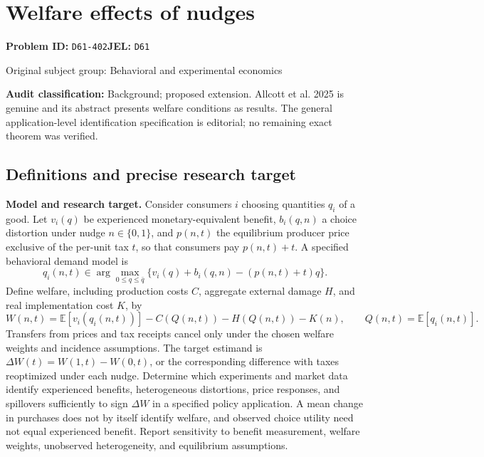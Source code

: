 \documentclass[11pt,a4paper]{article}
\begin{document}
\section*{Welfare effects of nudges}
\textbf{Problem ID:} \texttt{D61-402}\quad \textbf{JEL:} \texttt{D61}\par
\label{problem:OP-0309}
{\sffamily\small\color{muted}Original subject group: Behavioral and experimental economics\par}
\label{definitions:problem:30007591}
\textbf{Audit classification:} Background; proposed extension. Allcott et al. 2025 is genuine and its abstract presents welfare conditions as results. The general application-level identification specification is editorial; no remaining exact theorem was verified.
\subsection*{Definitions and precise research target}
\textbf{Model and research target.} Consider consumers \(i\) choosing quantities \(q_i\) of a good. Let \(v_i(q)\) be experienced monetary-equivalent benefit, \(b_i(q,n)\) a choice distortion under nudge \(n\in\{0,1\}\), and \(p(n,t)\) the equilibrium producer price exclusive of the per-unit tax \(t\), so that consumers pay \(p(n,t)+t\). A specified behavioral demand model is
\[q_i(n,t)\in\arg\max_{0\leq q\leq\bar q}\{v_i(q)+b_i(q,n)-(p(n,t)+t)q\}.\]
Define welfare, including production costs \(C\), aggregate external damage \(H\), and real implementation cost \(K\), by
\[W(n,t)=\mathbb E[v_i(q_i(n,t))]-C(Q(n,t))-H(Q(n,t))-K(n),\qquad Q(n,t)=\mathbb E[q_i(n,t)].\]
Transfers from prices and tax receipts cancel only under the chosen welfare weights and incidence assumptions. The target estimand is \(\Delta W(t)=W(1,t)-W(0,t)\), or the corresponding difference with taxes reoptimized under each nudge. Determine which experiments and market data identify experienced benefits, heterogeneous distortions, price responses, and spillovers sufficiently to sign \(\Delta W\) in a specified policy application. A mean change in purchases does not by itself identify welfare, and observed choice utility need not equal experienced benefit. Report sensitivity to benefit measurement, welfare weights, unobserved heterogeneity, and equilibrium assumptions.
\end{document}

